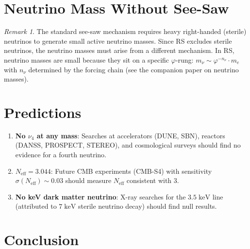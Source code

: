 \documentclass[12pt,a4paper]{article}
\theoremstyle{definition}
\theoremstyle{remark}
\newtheorem{remark}[theorem]{Remark}
\begin{document}
\section{Neutrino Mass Without See-Saw}
\label{sec:mass}

\begin{remark}
The standard see-saw mechanism requires heavy right-handed
(sterile) neutrinos to generate small active neutrino masses.
Since RS excludes sterile neutrinos, the neutrino masses must arise
from a different mechanism.  In RS, neutrino masses are small because
they sit on a specific $\varphi$-rung:
$m_\nu \sim \varphi^{-n_\nu} \cdot m_e$ with $n_\nu$ determined by
the forcing chain (see the companion paper on neutrino masses).
\end{remark}

\section{Predictions}
\label{sec:predictions}

\begin{enumerate}
  \item \textbf{No $\nu_4$ at any mass}: Searches at accelerators
  (DUNE, SBN), reactors (DANSS, PROSPECT, STEREO), and cosmological
  surveys should find no evidence for a fourth neutrino.

  \item \textbf{$N_{\mathrm{eff}} = 3.044$}: Future CMB experiments
  (CMB-S4) with sensitivity $\sigma(N_{\mathrm{eff}}) \sim 0.03$
  should measure $N_{\mathrm{eff}}$ consistent with 3.

  \item \textbf{No keV dark matter neutrino}: X-ray searches for
  the $3.5\;\mathrm{keV}$ line (attributed to $7\;\mathrm{keV}$
  sterile neutrino decay) should find null results.
\end{enumerate}

\section{Conclusion}
\label{sec:conclusion}
\end{document}

